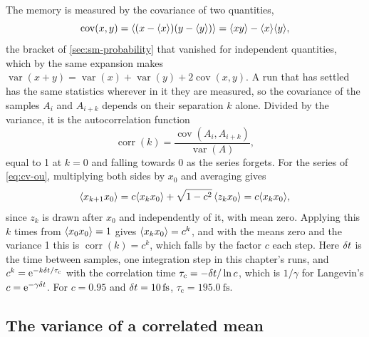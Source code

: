 The memory is measured by the covariance of two quantities,
\begin{equation*}
   \operatorname{cov}(x, y) = \langle (x - \langle x \rangle)(y - \langle y \rangle) \rangle
   = \langle xy \rangle - \langle x \rangle\langle y \rangle ,
\end{equation*}
the bracket of \cref{sec:sm-probability} that vanished for independent
quantities, which by the same expansion makes $\operatorname{var}(x + y) =
\operatorname{var}(x) + \operatorname{var}(y) + 2\operatorname{cov}(x, y)$.
A run that has settled has the same statistics wherever in it they are
measured, so the covariance of the samples $A_i$ and $A_{i+k}$ depends on
their separation $k$ alone. Divided by the variance, it is the
autocorrelation function
\begin{equation*}
   \operatorname{corr}(k) = \frac{\operatorname{cov}(A_i,
   A_{i+k})}{\operatorname{var}(A)} ,
\end{equation*}
equal to 1 at $k = 0$ and falling towards 0 as the series forgets. For the
series of \cref{eq:cv-ou}, multiplying both sides by $x_0$ and averaging
gives
\begin{equation*}
   \langle x_{k+1}x_0 \rangle = c\langle x_kx_0 \rangle + \sqrt{1 - c^2}\,\langle z_kx_0 \rangle
   = c\langle x_kx_0 \rangle ,
\end{equation*}
since $z_k$ is drawn after $x_0$ and independently of it, with mean zero.
Applying this $k$ times from $\langle x_0x_0 \rangle = 1$ gives $\langle x_kx_0 \rangle = c^k$,
and with the means zero and the variance 1 this is $\operatorname{corr}(k)
= c^k$, which falls by the factor $c$ each step. Here $\delta t$ is the time
between samples, one integration step in this chapter's runs, and $c^k =
\mathrm{e}^{-k\delta t/\tau_{\mathrm c}}$ with the correlation time $\tau_{\mathrm
c} = -\delta t/\ln c$, which is $1/\gamma$ for Langevin's $c =
\mathrm{e}^{-\gamma\delta t}$. For $c = 0.95$ and $\dt = \SI{10}{\femto
\second}$, $\tau_{\mathrm c} = \SI{195.0}{\femto\second}$.

\subsection*{The variance of a correlated mean}

